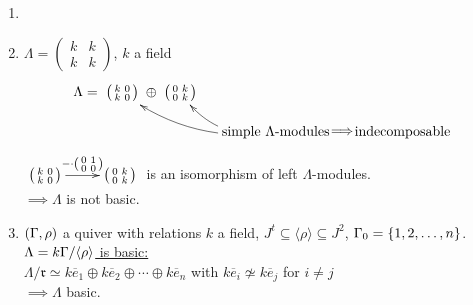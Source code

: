 \begin{exam}
\begin{enumerate}
\item[]
\item $\Lambda = \left(\begin{smallmatrix} k & k\\ k & k \end{smallmatrix}\right)$, $k$ a field
\[ \Lambda = \xymatrix@C-1pc@R-1pc{
{\left(\begin{smallmatrix} k & 0\\ k & 0 \end{smallmatrix}\right) } \ar@{}[r]|-*[@]{\oplus}& {\left(\begin{smallmatrix} 0 & k\\ 0 & k \end{smallmatrix}\right)} &&\\
&  & \ar@/^1pc/[ul] \ar@/^1pc/[ull] {\text{simple }\Lambda\text{-modules}} \ar@{}[r]|-*[@]{\implies}& \text{indecomposable}
}\]
$\xymatrix{{\left(\begin{smallmatrix} k & 0\\ k & 0 \end{smallmatrix}\right) } \ar[r]^{- \cdot {\left(\begin{smallmatrix} 0 & 1\\ 0 & 0 \end{smallmatrix}\right)}}& {\left(\begin{smallmatrix} 0 & k\\ 0 & k \end{smallmatrix}\right)}}$ is an isomorphism of left $\Lambda$-modules.\\
$\implies \Lambda$ is not basic.

\item $(\Gamma, \rho)$ a quiver with relations $k$ a field, $J^t \subseteq
  \langle \rho \rangle \subseteq J^2$, $\Gamma_0 = \{ 1, 2, \ldots, n \}$.\\
\underline{$\Lambda = k\Gamma/\langle \rho \rangle$ is basic:}\\
$\Lambda/\mathfrak{r} \simeq k\overline{e}_1 \oplus k\overline{e}_2 \oplus \cdots \oplus k\overline{e}_n$ with $k\overline{e}_i \not\simeq k\overline{e}_j$ for $i \neq j$\\
$\implies \Lambda$ basic.
\end{enumerate}
\end{exam}

